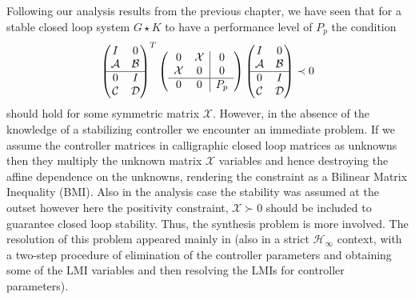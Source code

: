 Following our analysis results from the previous chapter, we have seen that for a stable closed loop system $G\star K$ to have 
a performance level of $P_p$ the condition
\[
\begin{pmatrix}I&0\\\mathcal{A}&\mathcal{B}\\\hline 0&I\\\mathcal{C}&\mathcal{D}\end{pmatrix}^T
\left(
\begin{array}{cc|c}
	0&\mathcal{X}&0\\\mathcal{X}&0&0\\\hline 0&0&P_p
\end{array}
\right)
\begin{pmatrix}I&0\\\mathcal{A}&\mathcal{B}\\\hline 0&I\\\mathcal{C}&\mathcal{D}\end{pmatrix}\prec 0
\]
should hold for some symmetric matrix $\mathcal{X}$. However, in the absence of the knowledge of a stabilizing controller we encounter
an immediate problem. If we assume the controller matrices in calligraphic closed loop matrices as unknowns then they multiply the unknown
matrix $\mathcal{X}$ variables and hence destroying the affine dependence on the unknowns, rendering the constraint as a Bilinear Matrix 
Inequality (BMI). Also in the analysis case the stability was assumed at the outset however here the positivity constraint,
$\mathcal{X}\succ 0$ should be included to guarantee closed loop stability. Thus, the synthesis problem is more involved. The resolution of 
this problem appeared mainly in \cite{scherermulti,izumi} (also in a strict $\mathcal{H}_\infty$ context, \cite{gahapk,gahinet96} with a
two-step procedure of elimination of the controller parameters and obtaining some of the LMI variables and then resolving the LMIs for 
controller parameters).

